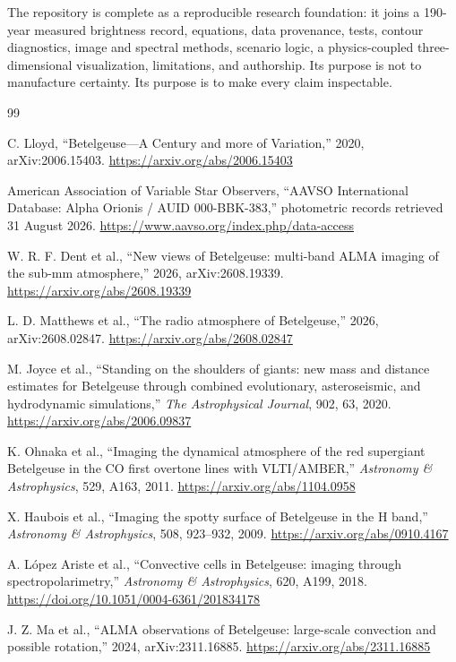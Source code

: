 \documentclass[11pt,a4paper]{article}
\begin{document}
The repository is complete as a reproducible research foundation: it joins a
190-year measured brightness record, equations, data provenance, tests,
contour diagnostics, image and spectral methods, scenario logic, a
physics-coupled three-dimensional visualization, limitations, and authorship.
Its purpose is not to manufacture certainty. Its purpose is to make every
claim inspectable.

\clearpage
\begin{thebibliography}{99}

C. Lloyd, ``Betelgeuse---A Century and more of Variation,'' 2020,
arXiv:2006.15403. \url{https://arxiv.org/abs/2006.15403}

American Association of Variable Star Observers, ``AAVSO International
Database: Alpha Orionis / AUID 000-BBK-383,'' photometric records retrieved
31 August 2026. \url{https://www.aavso.org/index.php/data-access}

W. R. F. Dent et al., ``New views of Betelgeuse: multi-band ALMA imaging of the sub-mm atmosphere,'' 2026, arXiv:2608.19339. \url{https://arxiv.org/abs/2608.19339}

L. D. Matthews et al., ``The radio atmosphere of Betelgeuse,'' 2026, arXiv:2608.02847. \url{https://arxiv.org/abs/2608.02847}

M. Joyce et al., ``Standing on the shoulders of giants: new mass and distance estimates for Betelgeuse through combined evolutionary, asteroseismic, and hydrodynamic simulations,'' \emph{The Astrophysical Journal}, 902, 63, 2020. \url{https://arxiv.org/abs/2006.09837}

K. Ohnaka et al., ``Imaging the dynamical atmosphere of the red supergiant Betelgeuse in the CO first overtone lines with VLTI/AMBER,'' \emph{Astronomy \& Astrophysics}, 529, A163, 2011. \url{https://arxiv.org/abs/1104.0958}

X. Haubois et al., ``Imaging the spotty surface of Betelgeuse in the H band,'' \emph{Astronomy \& Astrophysics}, 508, 923--932, 2009. \url{https://arxiv.org/abs/0910.4167}

A. L\'opez Ariste et al., ``Convective cells in Betelgeuse: imaging through spectropolarimetry,'' \emph{Astronomy \& Astrophysics}, 620, A199, 2018. \url{https://doi.org/10.1051/0004-6361/201834178}

J. Z. Ma et al., ``ALMA observations of Betelgeuse: large-scale convection and possible rotation,'' 2024, arXiv:2311.16885. \url{https://arxiv.org/abs/2311.16885}


\end{thebibliography}
\end{document}
